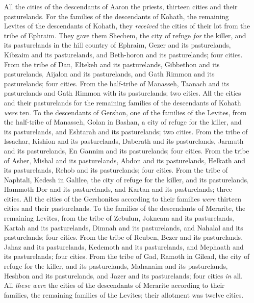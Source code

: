 \begin{biblechapter}
\verse All the cities of the descendants of Aaron the priests, thirteen cities and their pasturelands.
\verse For the families of the descendants of Kohath, the remaining Levites of the descendants of Kohath, they \textit{received} the cities of their lot from the tribe of Ephraim.
\verse They gave them Shechem, the city of refuge \textit{for} the killer, and its pasturelands in the hill country of Ephraim, Gezer and its pasturelands,
\verse Kibzaim and its pasturelands, and Beth-horon and its pasturelands; four cities.
\verse From the tribe of Dan, Eltekeh and its pasturelands, Gibbethon and its pasturelands,
\verse Aijalon and its pasturelands, and Gath Rimmon and its pasturelands; four cities.
\verse From the half-tribe of Manasseh, Taanach and its pasturelands and Gath Rimmon with its pasturelands; two cities.
\verse All the cities and their pasturelands for the remaining families of the descendants of Kohath \textit{were} ten.
\verse To the descendants of Gershon, one of the families of the Levites, from the half-tribe of Manasseh, Golan in Bashan, a city of refuge for the killer, and its pasturelands, and Eshtarah and its pasturelands; two cities.
\verse From the tribe of Issachar, Kishion and its pasturelands, Daberath and its pasturelands,
\verse Jarmuth and its pasturelands, En Gannim and its pasturelands; four cities.
\verse From the tribe of Asher, Mishal and its pasturelands, Abdon and its pasturelands,
\verse Helkath and its pasturelands, Rehob and its pasturelands; four cities.
\verse From the tribe of Naphtali, Kedesh in Galilee, the city of refuge for the killer, and its pasturelands, Hammoth Dor and its pasturelands, and Kartan and its pasturelands; three cities.
\verse All the cities of the Gershonites according to their families \textit{were} thirteen cities and their pasturelands.
\verse To the families of the descendants of Merarite, the remaining Levites, from the tribe of Zebulun, Jokneam and its pasturelands, Kartah and its pasturelands,
\verse Dimnah and its pasturelands, and Nahalal and its pasturelands; four cities.
\verse From the tribe of Reuben, Bezer and its pasturelands, Jahaz and its pasturelands,
\verse Kedemoth and its pasturelands, and Mephaath and its pasturelands; four cities.
\verse From the tribe of Gad, Ramoth in Gilead, the city of refuge for the killer, and its pasturelands, Mahanaim and its pasturelands,
\verse Heshbon and its pasturelands, and Jazer and its pasturelands; four cities \textit{in} all.
\verse All \textit{these were} the cities of the descendants of Merarite according to their families, the remaining families of the Levites; their allotment was twelve cities.

\end{biblechapter}
